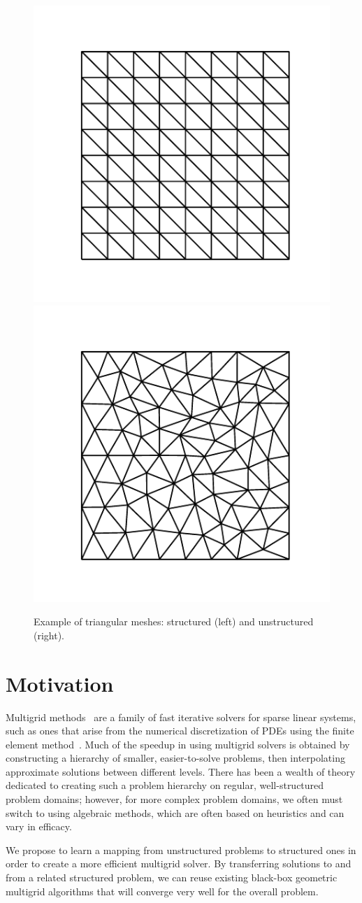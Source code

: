 \documentclass{article}
\begin{document}
\begin{figure}[!ht]
      \centering
      \includegraphics[width=.35\textwidth]{./figures/meshes/structured.pdf}
      \includegraphics[width=.35\textwidth]{./figures/meshes/unstructured.pdf}
      \caption{Example of triangular meshes: structured (left) and unstructured (right). } \label{fig:meshes}
\end{figure}

%
\section{Motivation}
Multigrid methods~\cite{RugeAMG1987,BriggsMgridTut} are a family of fast iterative solvers for sparse linear systems, such as ones that arise from the numerical discretization of PDEs using the finite element method~\cite{ClaesFEM}.  Much of the speedup in using multigrid solvers is obtained by constructing a hierarchy of smaller, easier-to-solve problems, then interpolating approximate solutions between different levels.  There has been a wealth of theory dedicated to creating such a problem hierarchy on regular, well-structured problem domains; however, for more complex problem domains, we often must switch to using algebraic methods, which are often based on heuristics and can vary in efficacy. 

We propose to learn a mapping from unstructured problems to structured ones in order to create a more efficient multigrid solver. By transferring solutions to and from a related structured problem, we can reuse existing black-box geometric multigrid algorithms that will converge very well for the overall problem. 
%
\end{document}
